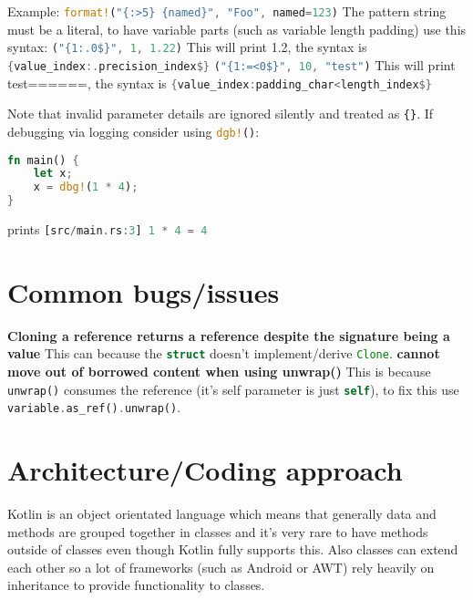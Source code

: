 \documentclass[a4paper,11pt]{article}
\begin{document}
Example:
\newline
\lstinline[language=Rust]|format!("{:>5} {named}", "Foo", named=123)|
\newline
The pattern string must be a literal, to have variable parts (such as variable length padding) use this syntax:
\newline
\lstinline[language=Rust]|("{1:.0$}", 1, 1.22)|
\newline
This will print 1.2, the syntax is \lstinline[language=Rust]|{value_index:.precision_index$}|
\newline
\lstinline[language=Rust]|("{1:=<0$}", 10, "test")| 
\newline
This will print test======, the syntax is \lstinline[language=Rust]|{value_index:padding_char<length_index$}|
\newline


Note that invalid parameter details are ignored silently and treated as \lstinline|{}|.
\newline
If debugging via logging consider using \lstinline[language=Rust]|dgb!()|:
\begin{lstlisting}[language=Rust,frame=single]
fn main() {
    let x;
    x = dbg!(1 * 4);
}
\end{lstlisting}
prints 
\newline
\lstinline[language=Rust]|[src/main.rs:3] 1 * 4 = 4|

\newpage
\section{Common bugs/issues}
\textbf{Cloning a reference returns a reference despite the signature being a value}
\newline
This can because the \lstinline[language=Rust]{struct} doesn't implement/derive \lstinline[language=Rust]{Clone}.
\medskip
\newline
\textbf{cannot move out of borrowed content when using unwrap()}
\newline
This is because \lstinline[language=Rust]{unwrap()} consumes the reference (it's self parameter is just \lstinline[language=Rust]{self}), to fix this use
\lstinline[language=Rust]{variable.as_ref().unwrap()}.

\newpage
\section{Architecture/Coding approach}

Kotlin is an object orientated language which means that generally data and methods are grouped together in classes and it's very rare to have methods outside of classes even though Kotlin fully supports this. Also classes can extend each other so a lot of frameworks (such as Android or AWT) rely heavily on inheritance to provide functionality to classes.
\end{document}
